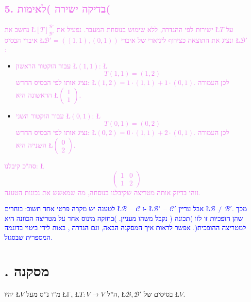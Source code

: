 \documentclass[english,hebrew]{article}
\begin{document}
\subsection*{\textcolor{violet}{5. בדיקה ישירה )לאימות(}}

\textcolor{violet}{נחשב את \L{$[T]_{\mathcal{B}'}^{\mathcal{B}'}$}
ישירות לפי ההגדרה, ללא שימוש בנוסחת המעבר. נפעיל את \L{$T$} על איברי
הבסיס \L{$\mathcal{B}'=((1,1),(0,1))$} ונציג את התוצאה כצירוף ליניארי
של איברי \L{$\mathcal{B}'$}: }
\begin{itemize}
\item \textcolor{violet}{עבור הוקטור הראשון \L{$(1,1)$}: \L{%
\[
T(1,1)=(1,2)
\]
}%
נציג אותו לפי הבסיס החדש: \L{$(1,2)=1\cdot(1,1)+1\cdot(0,1)$}. לכן
העמודה הראשונה היא \L{$\begin{pmatrix}1\\
1
\end{pmatrix}$}. }
\item \textcolor{violet}{עבור הוקטור השני \L{$(0,1)$}: \L{%
\[
T(0,1)=(0,2)
\]
}%
נציג אותו לפי הבסיס החדש: \L{$(0,2)=0\cdot(1,1)+2\cdot(0,1)$}. לכן
העמודה השנייה היא \L{$\begin{pmatrix}0\\
2
\end{pmatrix}$}. }
\end{itemize}
\textcolor{violet}{סה"כ קיבלנו: \L{%
\[
\begin{pmatrix}1 & 0\\
1 & 2
\end{pmatrix}
\]
}%
זוהי בדיוק אותה מטריצה שקיבלנו בנוסחה, מה שמאשש את נכונות הטענה.}

\textcolor{blue}{לטענה }\textcolor{blue}{{}\endL}\textcolor{blue}{{}
יש מקרה פרטי אחד חשוב: בוחרים \L{$\mathcal{B}=\mathcal{C}$} ו- \L{$\mathcal{B}'=\mathcal{C}'$}
אבל עדיין \L{$\mathcal{B}\neq\mathcal{B}'$}. מכך שהן הופכיות זו לזו
)תכונה }\textcolor{blue}{{}\endL}\textcolor{blue}{( נקבל
משהו מעניין. )בחזקה מינוס אחד על מטריצה הכוונה היא למטריצה ההופכית(.
אפשר לראות איך המסקנה הבאה, וגם הגדרה }\textcolor{blue}{{}\endL}\textcolor{blue}{,
באות לידי ביטוי בדוגמה המספרית שבסגול.}

\section{{\endL}. מסקנה}

יהיו \L{$V$} מ\textquotedblright ו נ\textquotedblright ס מעל \L{$\mathbb{F}$},
\L{$T:V\rightarrow V$} ה\textquotedblright ל, \L{$\mathcal{B},\mathcal{B}'$}
בסיסים של \L{$V$}.
\end{document}
